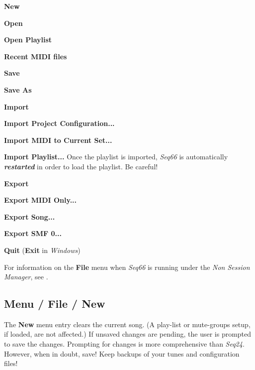    \begin{enumber}
      \item \textbf{New}
      \item \textbf{Open}
      \item \textbf{Open Playlist}
      \item \textbf{Recent MIDI files}
      \item \textbf{Save}
      \item \textbf{Save As}
      \item \textbf{Import}
      \begin{enumber}
         \item \textbf{Import Project Configuration...}
         \item \textbf{Import MIDI to Current Set...}
         \item \textbf{Import Playlist...}
         Once the playlist is imported,
         \textsl{Seq66} is automatically \textsl{\textbf{restarted}}
         in order to load the playlist.
         Be careful!
      \end{enumber}
      \item \textbf{Export}
      \begin{enumber}
         \item \textbf{Export MIDI Only...}
         \item \textbf{Export Song...}
         \item \textbf{Export SMF 0...}
      \end{enumber}
      \item \textbf{Quit} (\textbf{Exit} in \textsl{Windows})
   \end{enumber}

   For information on the \textbf{File} menu when \textsl{Seq66} is
   running under the \textsl{Non Session Manager}, see
   .

\subsection{Menu / File / New}
\label{subsec:menu_file_new}

   The \textbf{New} menu entry clears the current song.
   (A play-list or mute-groups setup, if loaded, are not affected.)
   If unsaved changes are pending, the user is prompted to save the changes.
   Prompting for changes is more comprehensive than \textsl{Seq24}.
   However, when in doubt, save!
   Keep backups of your tunes and configuration files!

